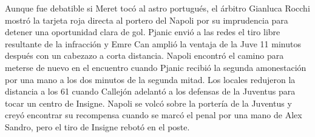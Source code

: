 \documentclass{article}%
\begin{document}
\newline%
%
Aunque fue debatible si Meret tocó al astro portugués, el árbitro Gianluca Rocchi mostró la tarjeta roja directa al portero del Napoli por su imprudencia para detener una oportunidad clara de gol.%
\newline%
%
Pjanic envió a las redes el tiro libre resultante de la infracción y Emre Can amplió la ventaja de la Juve 11 minutos después con un cabezazo a corta distancia.%
\newline%
%
Napoli encontró el camino para meterse de nuevo en el encuentro cuando Pjanic recibió la segunda amonestación por una mano a los dos minutos de la segunda mitad.%
\newline%
%
Los locales redujeron la distancia a los 61 cuando Callejón adelantó a los defensas de la Juventus para tocar un centro de Insigne.%
\newline%
%
Napoli se volcó sobre la portería de la Juventus y creyó encontrar su recompensa cuando se marcó el penal por una mano de Alex Sandro, pero el tiro de Insigne rebotó en el poste.%
\newline%
%
\end{document}
